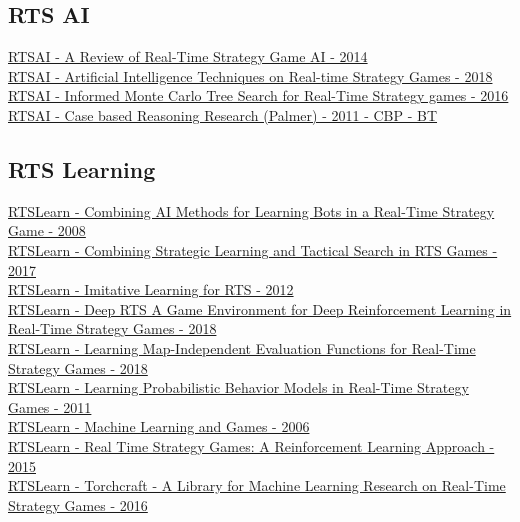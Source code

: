 \subsection{RTS AI}

\href{https://ojs.aaai.org/index.php/aimagazine/article/view/2478}{RTSAI - A Review of Real-Time Strategy Game AI - 2014}
\\
\href{https://dl.acm.org/doi/10.1145/3297156.3297188}{RTSAI - Artificial Intelligence Techniques on Real-time Strategy Games - 2018}
\\
\href{https://ieeexplore.ieee.org/abstract/document/7860394}{RTSAI - Informed Monte Carlo Tree Search for Real-Time Strategy games - 2016}
\\
\href{https://link.springer.com/chapter/10.1007/978-3-642-23291-6_15}{RTSAI - Case based Reasoning Research (Palmer) - 2011 - CBP - BT}

\subsection{RTS Learning}

\href{https://www.hindawi.com/journals/ijcgt/2009/129075/}{RTSLearn - Combining AI Methods for Learning Bots in a Real-Time Strategy Game - 2008}
\\
\href{https://ojs.aaai.org/index.php/AIIDE/article/view/12922}{RTSLearn - Combining Strategic Learning and Tactical Search in RTS Games - 2017}
\\
\href{https://ieeexplore.ieee.org/abstract/document/6374186}{RTSLearn - Imitative Learning for RTS - 2012}
\\
\href{https://ieeexplore.ieee.org/abstract/document/8490409}{RTSLearn - Deep RTS A Game Environment for Deep Reinforcement Learning in Real-Time Strategy Games - 2018}
\\
\href{https://ieeexplore.ieee.org/abstract/document/8490369}{RTSLearn - Learning Map-Independent Evaluation Functions for Real-Time Strategy Games - 2018}
\\
\href{https://ojs.aaai.org/index.php/AIIDE/article/view/12433}{RTSLearn - Learning Probabilistic Behavior Models in Real-Time Strategy Games - 2011}
\\
\href{https://link.springer.com/article/10.1007/s10994-006-8919-x}{RTSLearn - Machine Learning and Games - 2006}
\\
\href{https://www.sciencedirect.com/science/article/pii/S187705091501354X}{RTSLearn - Real Time Strategy Games: A Reinforcement Learning Approach - 2015}
\\
\href{https://arxiv.org/abs/1611.00625}{RTSLearn - Torchcraft - A Library for Machine Learning Research on Real-Time Strategy Games - 2016}
